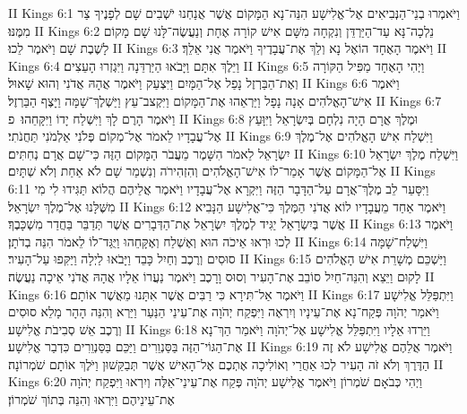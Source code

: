 II Kings 6:1	וַיֹּאמְרוּ בְנֵי־הַנְּבִיאִים אֶל־אֱלִישָׁע הִנֵּה־נָא הַמָּקוֹם אֲשֶׁר אֲנַחְנוּ יֹשְׁבִים שָׁם לְפָנֶיךָ צַר מִמֶּנּוּ׃
II Kings 6:2	נֵלְכָה־נָּא עַד־הַיַּרְדֵּן וְנִקְחָה מִשָּׁם אִישׁ קוֹרָה אֶחָת וְנַעֲשֶׂה־לָּנוּ שָׁם מָקוֹם לָשֶׁבֶת שָׁם וַיֹּאמֶר לֵכוּ׃
II Kings 6:3	וַיֹּאמֶר הָאֶחָד הוֹאֶל נָא וְלֵךְ אֶת־עֲבָדֶיךָ וַיֹּאמֶר אֲנִי אֵלֵךְ׃
II Kings 6:4	וַיֵּלֶךְ אִתָּם וַיָּבֹאוּ הַיַּרְדֵּנָה וַיִּגְזְרוּ הָעֵצִים׃
II Kings 6:5	וַיְהִי הָאֶחָד מַפִּיל הַקּוֹרָה וְאֶת־הַבַּרְזֶל נָפַל אֶל־הַמָּיִם וַיִּצְעַק וַיֹּאמֶר אֲהָהּ אֲדֹנִי וְהוּא שָׁאוּל׃
II Kings 6:6	וַיֹּאמֶר אִישׁ־הָאֱלֹהִים אָנָה נָפָל וַיַּרְאֵהוּ אֶת־הַמָּקוֹם וַיִּקְצב־עֵץ וַיַּשְׁלֶךְ־שָׁמָּה וַיָּצֶף הַבַּרְזֶל׃
II Kings 6:7	וַיֹּאמֶר הָרֶם לָךְ וַיִּשְׁלַח יָדוֹ וַיִּקָּחֵהוּ׃ {פ}
II Kings 6:8	וּמֶלֶךְ אֲרָם הָיָה נִלְחָם בְּיִשְׂרָאֵל וַיִּוָּעַץ אֶל־עֲבָדָיו לֵאמֹר אֶל־מְקוֹם פְּלֹנִי אַלְמֹנִי תַּחֲנֹתִי׃
II Kings 6:9	וַיִּשְׁלַח אִישׁ הָאֱלֹהִים אֶל־מֶלֶךְ יִשְׂרָאֵל לֵאמֹר הִשָּׁמֶר מֵעֲבֹר הַמָּקוֹם הַזֶּה כִּי־שָׁם אֲרָם נְחִתִּים׃
II Kings 6:10	וַיִּשְׁלַח מֶלֶךְ יִשְׂרָאֵל אֶל־הַמָּקוֹם אֲשֶׁר אָמַר־לוֹ אִישׁ־הָאֱלֹהִים וְהִזְהִירֹה וְנִשְׁמַר שָׁם לֹא אַחַת וְלֹא שְׁתָּיִם׃
II Kings 6:11	וַיִּסָּעֵר לֵב מֶלֶךְ־אֲרָם עַל־הַדָּבָר הַזֶּה וַיִּקְרָא אֶל־עֲבָדָיו וַיֹּאמֶר אֲלֵיהֶם הֲלוֹא תַּגִּידוּ לִי מִי מִשֶּׁלָּנוּ אֶל־מֶלֶךְ יִשְׂרָאֵל׃
II Kings 6:12	וַיֹּאמֶר אַחַד מֵעֲבָדָיו לוֹא אֲדֹנִי הַמֶּלֶךְ כִּי־אֱלִישָׁע הַנָּבִיא אֲשֶׁר בְּיִשְׂרָאֵל יַגִּיד לְמֶלֶךְ יִשְׂרָאֵל אֶת־הַדְּבָרִים אֲשֶׁר תְּדַבֵּר בַּחֲדַר מִשְׁכָּבֶךָ׃
II Kings 6:13	וַיֹּאמֶר לְכוּ וּרְאוּ אֵיכֹה הוּא וְאֶשְׁלַח וְאֶקָּחֵהוּ וַיֻּגַּד־לוֹ לֵאמֹר הִנֵּה בְדֹתָן׃
II Kings 6:14	וַיִּשְׁלַח־שָׁמָּה סוּסִים וְרֶכֶב וְחַיִל כָּבֵד וַיָּבֹאוּ לַיְלָה וַיַּקִּפוּ עַל־הָעִיר׃
II Kings 6:15	וַיַּשְׁכֵּם מְשָׁרֵת אִישׁ הָאֱלֹהִים לָקוּם וַיֵּצֵא וְהִנֵּה־חַיִל סוֹבֵב אֶת־הָעִיר וְסוּס וָרָכֶב וַיֹּאמֶר נַעֲרוֹ אֵלָיו אֲהָהּ אֲדֹנִי אֵיכָה נַעֲשֶׂה׃
II Kings 6:16	וַיֹּאמֶר אַל־תִּירָא כִּי רַבִּים אֲשֶׁר אִתָּנוּ מֵאֲשֶׁר אוֹתָם׃
II Kings 6:17	וַיִּתְפַּלֵּל אֱלִישָׁע וַיֹּאמַר יְהֹוָה פְּקַח־נָא אֶת־עֵינָיו וְיִרְאֶה וַיִּפְקַח יְהֹוָה אֶת־עֵינֵי הַנַּעַר וַיַּרְא וְהִנֵּה הָהָר מָלֵא סוּסִים וְרֶכֶב אֵשׁ סְבִיבֹת אֱלִישָׁע׃
II Kings 6:18	וַיֵּרְדוּ אֵלָיו וַיִּתְפַּלֵּל אֱלִישָׁע אֶל־יְהֹוָה וַיֹּאמַר הַךְ־נָא אֶת־הַגּוֹי־הַזֶּה בַּסַּנְוֵרִים וַיַּכֵּם בַּסַּנְוֵרִים כִּדְבַר אֱלִישָׁע׃
II Kings 6:19	וַיֹּאמֶר אֲלֵהֶם אֱלִישָׁע לֹא זֶה הַדֶּרֶךְ וְלֹא זֹה הָעִיר לְכוּ אַחֲרַי וְאוֹלִיכָה אֶתְכֶם אֶל־הָאִישׁ אֲשֶׁר תְּבַקֵּשׁוּן וַיֹּלֶךְ אוֹתָם שֹׁמְרוֹנָה׃
II Kings 6:20	וַיְהִי כְּבֹאָם שֹׁמְרוֹן וַיֹּאמֶר אֱלִישָׁע יְהֹוָה פְּקַח אֶת־עֵינֵי־אֵלֶּה וְיִרְאוּ וַיִּפְקַח יְהֹוָה אֶת־עֵינֵיהֶם וַיִּרְאוּ וְהִנֵּה בְּתוֹךְ שֹׁמְרוֹן׃
